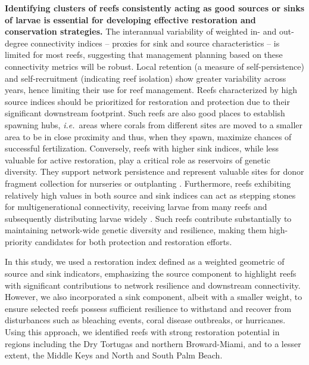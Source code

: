 \documentclass[preprint,12pt,authoryear]{elsarticle}
\newcommand{\ie}{{\it i.e.}\ }
\begin{document}
\textbf{Identifying clusters of reefs consistently acting as good sources or sinks of larvae is essential for developing effective restoration and conservation strategies.} The interannual variability of weighted in- and out-degree connectivity indices -- proxies for sink and source characteristics -- is limited for most reefs, suggesting that management planning based on these connectivity metrics will be robust. Local retention (a measure of self-persistence) and self-recruitment (indicating reef isolation) show greater variability across years, hence limiting their use for reef management. Reefs characterized by high source indices should be prioritized for restoration and protection due to their significant downstream footprint. Such reefs are also good places to establish spawning hubs, \ie areas where corals from different sites are moved to a smaller area to be in close proximity and thus, when they spawn, maximize chances of successful fertilization. Conversely, reefs with higher sink indices, while less valuable for active restoration, play a critical role as reservoirs of genetic diversity. They support network persistence and represent valuable sites for donor fragment collection for nurseries or outplanting \citep{king2023larval}. Furthermore, reefs exhibiting relatively high values in both source and sink indices can act as stepping stones for multigenerational connectivity, receiving larvae from many reefs and subsequently distributing larvae widely \citep{frys2020fine}. Such reefs contribute substantially to maintaining network-wide genetic diversity and resilience, making them high-priority candidates for both protection and restoration efforts.

In this study, we used a restoration index defined as a weighted geometric of source and sink indicators, emphasizing the source component to highlight reefs with significant contributions to network resilience and downstream connectivity. However, we also incorporated a sink component, albeit with a smaller weight, to ensure selected reefs possess sufficient resilience to withstand and recover from disturbances such as bleaching events, coral disease outbreaks, or hurricanes. Using this approach, we identified reefs with strong restoration potential in regions including the Dry Tortugas and northern Broward-Miami, and to a lesser extent, the Middle Keys and North and South Palm Beach.
\end{document}
